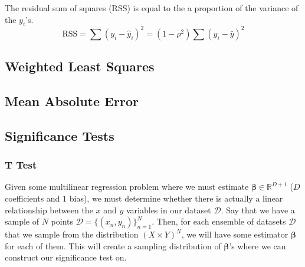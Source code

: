 \documentclass{article}
\begin{document}
    \begin{theorem}
      The residual sum of squares (RSS) is equal to the a proportion of the variance of the $y_i$'s. 
      \begin{equation}
        \mathrm{RSS} = \sum (y_i - \hat{y}_i)^2 = (1 - \rho^2) \sum (y_i - \bar{y})^2 
      \end{equation}
    \end{theorem}

  \subsection{Weighted Least Squares}


  \subsection{Mean Absolute Error}


  \subsection{Significance Tests}

    \subsubsection{T Test}

      Given some multilinear regression problem where we must estimate $\boldsymbol{\beta} \in \mathbb{R}^{D + 1}$ ($D$ coefficients and $1$ bias), we must determine whether there is actually a linear relationship between the $x$ and $y$ variables in our dataset $\mathcal{D}$. Say that we have a sample of $N$ points $\mathcal{D} = \{(x_n, y_n)\}_{n=1}^N$. Then, for each ensemble of datasets $\mathcal{D}$ that we sample from the distribution $(X \times Y)^N$, we will have some estimator $\boldsymbol{\beta}$ for each of them. This will create a sampling distribution of $\boldsymbol{\beta}$'s where we can construct our significance test on. 
\end{document}
